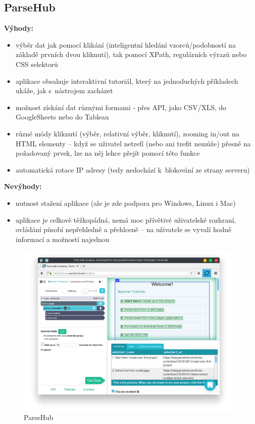 \documentclass[thesis=B,czech]{FITthesis}[2012/06/26]
\begin{document}
\subsection{ParseHub}
\textbf{Výhody:}
\begin{itemize}
	\item výběr dat jak pomocí klikání (inteligentní hledání vzorců/podobností na základě prvních dvou kliknutí), tak pomocí XPath, regulárních výrazů nebo CSS selektorů
	\item aplikace obsahuje interaktivní tutoriál, který na jednoduchých příkladech ukáže, jak s~nástrojem zacházet
	\item možnost získání dat různými formami - přes API, jako CSV/XLS, do GoogleSheets nebo do Tableau
	\item různé módy kliknutí (výběr, relativní výběr, kliknutí), zooming in/out na HTML elementy -- když se uživatel netrefí (nebo ani trefit nemůže) přesně na požadovaný prvek, lze na něj lehce přejít pomocí této funkce
	\item automatická rotace IP adresy (tedy nedochází k~blokování ze strany serveru)
\end{itemize}
\textbf{Nevýhody:}
\begin{itemize}
	\item nutnost stažení aplikace (ale je zde podpora pro Windows, Linux i Mac)
	\item aplikace je celkově těžkopádná, nemá moc přívětivé uživatelské rozhraní, ovládání působí nepřehledně a přehlceně -- na uživatele se vyvalí hodně informací a možností najednou
\end{itemize}
\begin{figure}[h]
	\includegraphics[width=\linewidth]{images/ParseHub.png}
	\caption{ParseHub}
	\label{fig:parseHub}
\end{figure}
\end{document}
